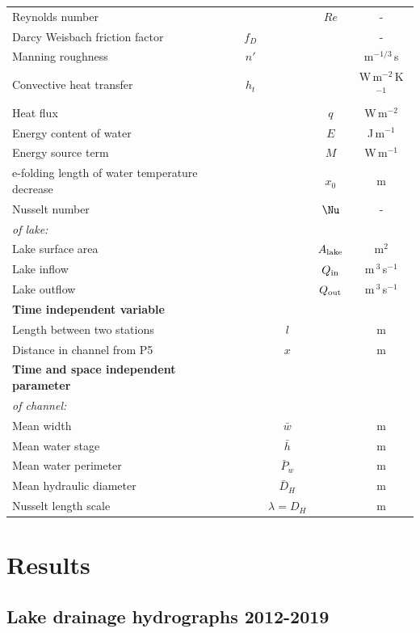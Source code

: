 \begin{table}
\begin{tabular}{l c c c c }
Reynolds number &  && $Re$ & -\\
Darcy Weisbach friction factor & $f_D$ && & -\\
Manning roughness & $n'$ && & m$^{-1/3}$\,s\\
Convective heat transfer & $h_t$ && & W\,m$^{-2}$\,K$^{-1}$\\
Heat flux & && $q$ & W\,m$^{-2}$\\
Energy content of water &&& $E$ & J\,m$^{-1}$\\
Energy source term &&& $M$ & W\,m$^{-1}$\\
e-folding length of water temperature decrease  & && $x_0$ & m\\
Nusselt number & && $\Nu$ & - \\
\cline{1-1}
\textit{of lake:} & & & \\
Lake surface area & && $A_{\rm lake}$ & m$^2$\\
Lake inflow & & &$Q_{\rm in}$ & m\,$^3$\,s$^{-1}$\\
Lake outflow &  & &$Q_{\rm out}$  & m\,$^3$\,s$^{-1}$\\
\hline
\textbf{Time independent variable} & & &   \\
\hline
Length between two stations & & $l$ &  & m\\
Distance in channel from P5 & & $x$ &  & m\\
\hline
\textbf{Time and space independent parameter} & & & \\
\hline
\textit{of channel:} \\
Mean width & & $\bar w$ & &  m\\
Mean water stage & &$\bar h$&  & m\\
Mean water perimeter & &$\bar P_w$&  & m\\
Mean hydraulic diameter & &$\bar D_H$&  & m\\
Nusselt length scale  & &$\lambda = D_H$& & m\\
\hline
\end{tabular}
\label{table variable}
\end{table}

\section{Results}
\label{sec:results}

\subsection{Lake drainage hydrographs 2012-2019}
\label{sec:results:phases}

